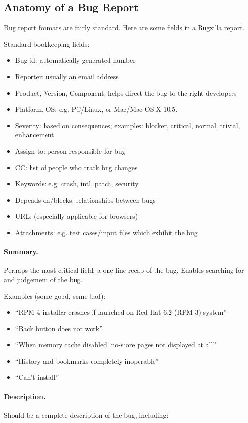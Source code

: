 \documentclass[11pt]{article}
\begin{document}
\clearpage
\subsection*{Anatomy of a Bug Report}
Bug report formats are fairly standard. Here are some fields
in a Bugzilla report.

Standard bookkeeping fields:
\begin{itemize}[noitemsep]
\item Bug id: automatically generated number
\item Reporter: usually an email address
\item Product, Version, Component: helps direct the bug to the right developers
\item Platform, OS: e.g. PC/Linux, or Mac/Mac OS X 10.5.
\item Severity: based on consequences; examples: blocker, critical, normal, trivial, enhancement
\item Assign to: person responsible for bug
\item CC: list of people who track bug changes
\item Keywords: e.g. crash, intl, patch, security
\item Depends on/blocks: relationships between bugs
\item URL: (especially applicable for browsers)
\item Attachments: e.g. test cases/input files which exhibit the bug
\end{itemize}

\paragraph{Summary.} Perhaps the most critical field: a one-line recap of the bug. Enables searching for and judgement of the bug.

Examples (some good, some bad):
\begin{itemize}[noitemsep]
\item ``RPM 4 installer crashes if launched on Red Hat 6.2 (RPM 3) system''
\item ``Back button does not work''
\item ``When memory cache disabled, no-store pages not displayed at all''
\item ``History and bookmarks completely inoperable''
\item ``Can't install''
\end{itemize}

\paragraph{Description.} Should be a complete description of the bug, 
including:
\end{document}
